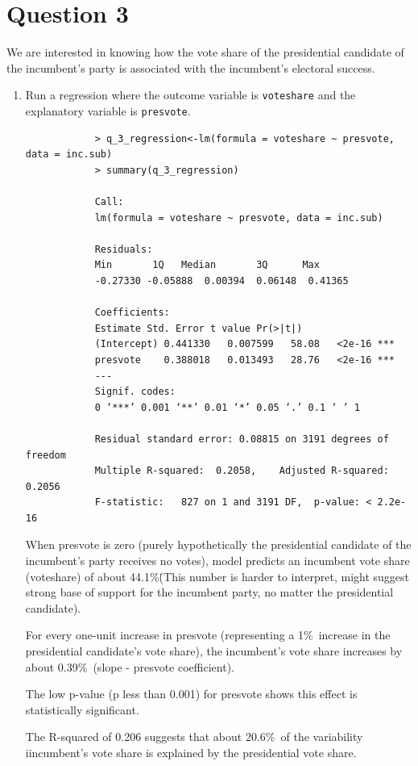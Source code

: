 \documentclass[12pt,letterpaper]{article}
\begin{document}
	\newpage	
\section*{Question 3}

\noindent We are interested in knowing how the vote share of the presidential candidate of the incumbent's party is associated with the incumbent's electoral success.
	\vspace{.25cm}
	\begin{enumerate}
		\item Run a regression where the outcome variable is \texttt{voteshare} and the explanatory variable is \texttt{presvote}. 
		\begin{verbatim}
			> q_3_regression<-lm(formula = voteshare ~ presvote, data = inc.sub)
			> summary(q_3_regression)
			
			Call:
			lm(formula = voteshare ~ presvote, data = inc.sub)
			
			Residuals:
			Min       1Q   Median       3Q      Max 
			-0.27330 -0.05888  0.00394  0.06148  0.41365 
			
			Coefficients:
			Estimate Std. Error t value Pr(>|t|)    
			(Intercept) 0.441330   0.007599   58.08   <2e-16 ***
			presvote    0.388018   0.013493   28.76   <2e-16 ***
			---
			Signif. codes:  
			0 ‘***’ 0.001 ‘**’ 0.01 ‘*’ 0.05 ‘.’ 0.1 ‘ ’ 1
			
			Residual standard error: 0.08815 on 3191 degrees of freedom
			Multiple R-squared:  0.2058,	Adjusted R-squared:  0.2056 
			F-statistic:   827 on 1 and 3191 DF,  p-value: < 2.2e-16
		\end{verbatim}

		When presvote is zero (purely hypothetically the presidential candidate of the incumbent’s party receives no votes), model predicts an incumbent vote share (voteshare) of about 44.1\%\. (This number is harder to interpret, might suggest strong base of support for the incumbent party, no matter the presidential candidate).
		
		For every one-unit increase in presvote (representing a 1\%\ increase in the presidential candidate’s vote share), the incumbent’s vote share increases by about 0.39\%\ (slope - presvote coefficient).
		
		The low p-value (p less than 0.001) for presvote shows this effect is statistically significant. 
		
		The R-squared of 0.206 suggests that about 20.6\%\ of the variability iincumbent’s vote share is explained by the presidential vote share.
		

\end{enumerate}
\end{document}
